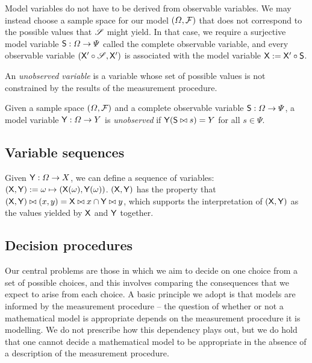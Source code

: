 Model variables do not have to be derived from observable variables. We may instead choose a sample space for our model $(\Omega,\mathcal{F})$ that does not correspond to the possible values that $\mathscr{S}$ might yield. In that case, we require a surjective model variable $\mathsf{S}:\Omega\to \Psi$ called the complete observable variable, and every observable variable $(\mathsf{X}'\circ \mathscr{S},\mathsf{X}')$ is associated with the model variable $\mathsf{X}:=\mathsf{X}'\circ \mathsf{S}$.

An \emph{unobserved variable} is a variable whose set of possible values is not constrained by the results of the measurement procedure.

\begin{definition}\label{def:unobserved_variable}
Given a sample space $(\Omega,\mathcal{F})$ and a complete observable variable $\mathsf{S}:\Omega\to\Psi$, a model variable $\mathsf{Y}:\Omega\to Y$ is \emph{unobserved} if $\mathsf{Y}(\mathsf{S}\bowtie s)=Y$ for all $s\in \Psi$.
\end{definition}

\subsection{Variable sequences}

Given $\mathsf{Y}:\Omega\to X$, we can define a sequence of variables: $(\mathsf{X},\mathsf{Y}):=\omega\mapsto (\mathsf{X}(\omega),\mathsf{Y}(\omega))$. $(\mathsf{X},\mathsf{Y})$ has the property that $(\mathsf{X},\mathsf{Y})\bowtie (x,y)= \mathsf{X}\bowtie x\cap \mathsf{Y}\bowtie y$, which supports the interpretation of $(\mathsf{X},\mathsf{Y})$ as the values yielded by $\mathsf{X}$ and $\mathsf{Y}$ together.

\subsection{Decision procedures}\label{sec:actions}

Our central problems are those in which we aim to decide on one choice from a set of possible choices, and this involves comparing the consequences that we expect to arise from each choice. A basic principle we adopt is that models are informed by the measurement procedure -- the question of whether or not a mathematical model is appropriate depends on the measurement procedure it is modelling. We do not prescribe how this dependency plays out, but we do hold that one cannot decide a mathematical model to be appropriate in the absence of a description of the measurement procedure.

